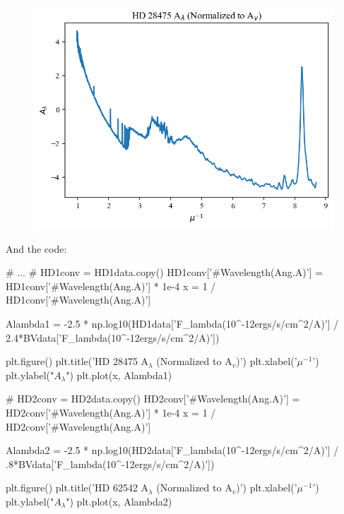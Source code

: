 \documentclass{article}
\begin{document}
\begin{figure}[H]
        \includegraphics[scale = .5]{Figure 2025-02-02 013752 (3).png}
    \end{figure}

    And the code:

    \begin{python}
        # ...
        #%
        HD1conv = HD1data.copy()
        HD1conv['#Wavelength(Ang.A)'] = HD1conv['#Wavelength(Ang.A)'] * 1e-4
        x = 1 / HD1conv['#Wavelength(Ang.A)']

        Alambda1 = -2.5 * np.log10(HD1data['F_lambda(10^-12ergs/s/cm^2/A)'] / 2.4*BVdata['F_lambda(10^-12ergs/s/cm^2/A)'])

        plt.figure()
        plt.title('HD 28475 A$_{\lambda}$ (Normalized to A$_v$)')
        plt.xlabel('$\mu^{-1}$')
        plt.ylabel("$A_\lambda$")
        plt.plot(x, Alambda1)

        #%
        HD2conv = HD2data.copy()
        HD2conv['#Wavelength(Ang.A)'] = HD2conv['#Wavelength(Ang.A)'] * 1e-4
        x = 1 / HD2conv['#Wavelength(Ang.A)']

        Alambda2 = -2.5 * np.log10(HD2data['F_lambda(10^-12ergs/s/cm^2/A)'] / .8*BVdata['F_lambda(10^-12ergs/s/cm^2/A)'])

        plt.figure()
        plt.title('HD 62542 A$_{\lambda}$ (Normalized to A$_v$)')
        plt.xlabel('$\mu^{-1}$')
        plt.ylabel("$A_\lambda$")
        plt.plot(x, Alambda2)
    \end{python}

    \subsection{}
\end{document}
